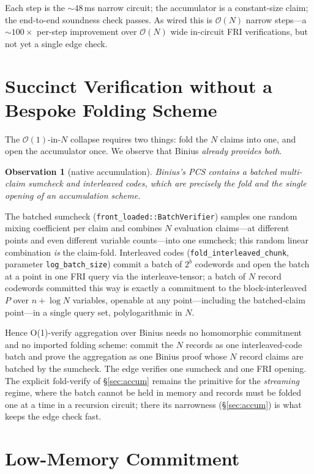 \documentclass[11pt]{article}
\newtheorem{observation}{Observation}
\newcommand{\bigO}{\mathcal{O}}
\begin{document}
Each step is the $\sim48$\,ms narrow circuit; the accumulator is a constant-size
claim; the end-to-end soundness check passes. As wired this is $\bigO(N)$ narrow
steps---a $\sim100\times$ per-step improvement over $\bigO(N)$ wide in-circuit
FRI verifications, but not yet a single edge check.

\section{Succinct Verification without a Bespoke Folding Scheme}\label{sec:succinct}

The $\bigO(1)$-in-$N$ collapse requires two things: fold the $N$ claims into one,
and open the accumulator once. We observe that Binius \emph{already provides both}.

\begin{observation}[native accumulation]\label{obs:native}
Binius's PCS contains a batched multi-claim sumcheck and interleaved codes, which
are precisely the fold and the single opening of an accumulation scheme.
\end{observation}

The batched sumcheck (\texttt{front\_loaded::BatchVerifier}) samples one random
mixing coefficient per claim and combines $N$ evaluation claims---at different
points and even different variable counts---into one sumcheck; this random linear
combination \emph{is} the claim-fold. Interleaved codes
(\texttt{fold\_interleaved\_chunk}, parameter \texttt{log\_batch\_size}) commit a
batch of $2^{b}$ codewords and open the batch at a point in one FRI query via the
interleave-tensor; a batch of $N$ record codewords committed this way is exactly a
commitment to the block-interleaved $P$ over $n+\log N$ variables, openable at any
point---including the batched-claim point---in a single query set, polylogarithmic
in $N$.

Hence O(1)-verify aggregation over Binius needs no homomorphic commitment and no
imported folding scheme: commit the $N$ records as one interleaved-code batch and
prove the aggregation as one Binius proof whose $N$ record claims are batched by
the sumcheck. The edge verifies one sumcheck and one FRI opening. The explicit
fold-verify of \S\ref{sec:accum} remains the primitive for the \emph{streaming}
regime, where the batch cannot be held in memory and records must be folded one at
a time in a recursion circuit; there its narrowness (\S\ref{sec:accum}) is what
keeps the edge check fast.

\section{Low-Memory Commitment}\label{sec:rss}
\end{document}
